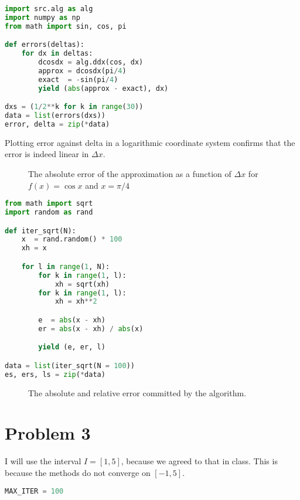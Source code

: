 \documentclass[12pt]{article}
\newcommand{\subtask}[1]{{\bf #1.}}
\begin{document}
\begin{multicols}{2}
\begin{lstlisting}[language=Python, caption={\sc Using the differentiation program}]
import src.alg as alg
import numpy as np
from math import sin, cos, pi

def errors(deltas):
    for dx in deltas:
        dcosdx = alg.ddx(cos, dx)
        approx = dcosdx(pi/4)
        exact  = -sin(pi/4)
        yield (abs(approx - exact), dx)

dxs = (1/2**k for k in range(30))
data = list(errors(dxs))
error, delta = zip(*data)
\end{lstlisting}
Plotting {\ttfamily error} against {\ttfamily delta} in
a logarithmic coordinate system confirms that the error
is indeed linear in $\Delta x$.

\begin{figure}[H]
\centering

\caption{
    The absolute error of the approximation as a function
    of $\Delta x$ for $f(x) = \cos x$ and $x = \pi/4$
}
\label{fig:ddx_err}
\end{figure}
\noindent



\noindent\subtask{b}
\begin{lstlisting}[language=Python, caption={{\sc Iterating with} {\ttfamily sqrt}}]
from math import sqrt
import random as rand

def iter_sqrt(N):
    x  = rand.random() * 100
    xh = x

    for l in range(1, N):
        for k in range(1, l):
            xh = sqrt(xh)
        for k in range(1, l):
            xh = xh**2

        e  = abs(x - xh)
        er = abs(x - xh) / abs(x)

        yield (e, er, l)

data = list(iter_sqrt(N = 100))
es, ers, ls = zip(*data)
\end{lstlisting}

\begin{figure}[H]
\centering

\caption{
    The absolute and relative error committed by the algorithm.
}
\label{fig:ddx_err}
\end{figure}
\noindent

\section*{Problem 3}
I will use the interval $I = [1, 5]$, because we agreed
to that in class.
This is because the methods do not converge on $[-1, 5]$.
\begin{lstlisting}[language=Python, caption={Bisection and Newtons method}]
MAX_ITER = 100


\end{lstlisting}
\end{multicols}
\end{document}
